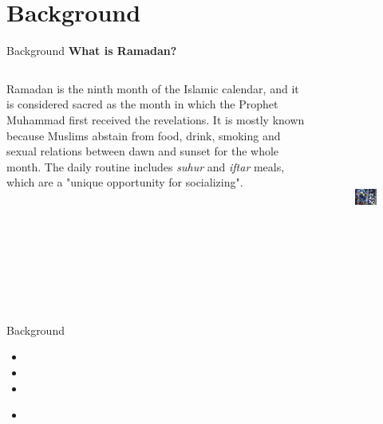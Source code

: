 \documentclass[pdftex,12pt,xcolor=pdftex,table]{beamer}
\begin{document}
\section{Background}
    \begin{frame}[t]{Background}
    \textbf{What is Ramadan?}
    \vspace{0.5cm}
    
    \begin{columns}[onlytextwidth]
    Ramadan is the ninth month of the Islamic calendar, and it is considered sacred as the month in which the Prophet Muhammad first received the revelations. It is mostly known because Muslims abstain from food, drink, smoking and sexual relations between dawn and sunset for the whole month. The daily routine includes \textit{suhur} and \textit{iftar} meals, which are a "unique opportunity for socializing".
    \begin{figure}[t]
    \, \includegraphics[width=4.5cm, height=5.9cm]{Ramadan-iftar-800px}
    \end{figure}
    \end{columns}
    \end{frame}
    
    \begin{frame}{Background}
    \begin{itemize}
    \item {}
    \item {}
    \item {}
    \end{itemize}
    \begin{itemize}
    \item {}
    \end{itemize}
    \end{frame}
\end{document}
